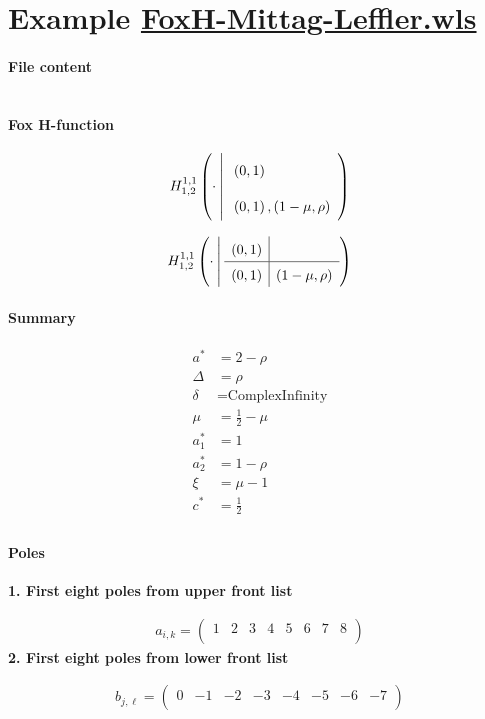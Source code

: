 \documentclass[11pt]{article}
\begin{document}
\section{Example \url{FoxH-Mittag-Leffler.wls}}

\paragraph{File content}

\inputminted{text}{FoxH-Mittag-Leffler.wls}

\paragraph{Fox H-function}

\begin{align*}
  \FoxH
    {1,1}
    {1,2}
    {\cdot}
    {\left(0, 1\right)}
    {\left(0, 1\right), \left(1-\mu, \rho\right)}
\end{align*}

\begin{align*}
  \FoxHext
    {1,1}
    {1,2}
    {\cdot}
    {\left(0, 1\right)}
    {}
    {\left(0, 1\right)}
    {\left(1-\mu, \rho\right)}
\end{align*}

\paragraph{Summary}

\begin{align*}
  a^*    & = 2-\rho \\
  \Delta & = \rho \\
  \delta & = \text{ComplexInfinity} \\
  \mu    & = \frac{1}{2}-\mu \\
  a_1^*  & = 1 \\
  a_2^*  & = 1-\rho \\
  \xi    & = \mu -1 \\
  c^*    & = \frac{1}{2} \\
\end{align*}

\paragraph{Poles}

\noindent\textbf{1. First eight poles from upper front list}

\begin{align*}
  a_{i,k} = 
  \left(
\begin{array}{cccccccc}
 1 & 2 & 3 & 4 & 5 & 6 & 7 & 8 \\
\end{array}
\right)
\end{align*}
\noindent\textbf{2. First eight poles from lower front list}

\begin{align*}
  b_{j,\ell} = 
  \left(
\begin{array}{cccccccc}
 0 & -1 & -2 & -3 & -4 & -5 & -6 & -7 \\
\end{array}
\right)
\end{align*}

\printbibliography[title={References}]
\end{document}
